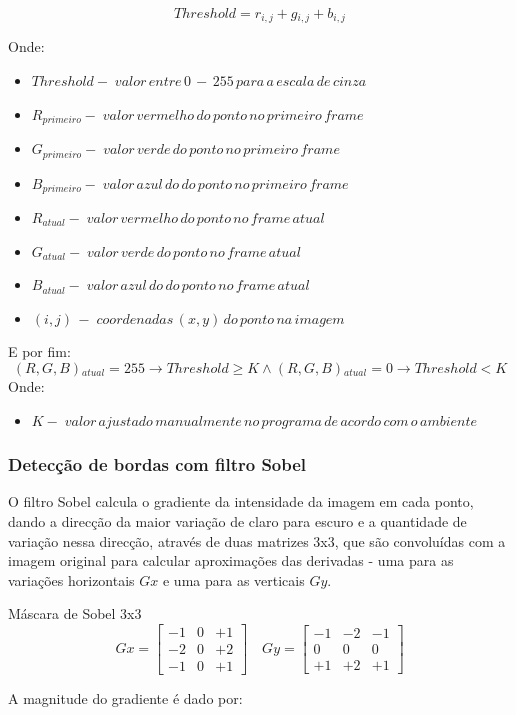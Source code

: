 \documentclass[12pt]{article}
\begin{document}
\begin{equation} \label{eq:threshold}
Threshold = r{_{i, j}} + g{_{i, j}} + b{_{i, j}}
\end{equation}

Onde:

\begin{itemize}  
  \item $Threshold -\; valor\,entre\,0\,-\,255\,para\,a\,escala\,de\,cinza $
  \item $R{_{primeiro}} -\; valor\,vermelho\,do\,ponto\,no\,primeiro\,frame\,$
  \item $G{_{primeiro}} -\; valor\,verde\,do\,ponto\,no\,primeiro\,frame \,$
  \item $B{_{primeiro}} -\; valor\,azul\,do\,do\,ponto\,no\,primeiro\,frame\,$
  \item $R{_{atual}}    -\; valor\,vermelho\,do\,ponto\,no\,frame\,atual$
  \item $G{_{atual}}    -\; valor\,verde\,do\,ponto\,no\,frame\,atual$
  \item $B{_{atual}}    -\; valor\,azul\,do\,do\,ponto\,no\,frame\,atual$
  \item $(i, j)       \,-\;coordenadas\, (x,y)\, do\, ponto\, na\, imagem$
\end{itemize}

E por fim:
\begin{equation}
(R, G, B){_{atual}} = 255 \rightarrow Threshold \geq K \wedge (R, G, B){_{atual}} = 0 \rightarrow Threshold < K
\end{equation}
Onde:

\begin{itemize}  
  \item $K -\; valor\,ajustado\,manualmente\,no\,programa\,de\,acordo\,com\,o\,ambiente$
\end{itemize}

\subsubsection{Detecção de bordas com filtro Sobel}

O filtro Sobel calcula o gradiente da intensidade da imagem em cada ponto, dando a direcção da maior variação de claro para escuro e a quantidade de variação nessa direcção, através de duas matrizes 3x3, que são convoluídas com a imagem original para calcular aproximações das derivadas - uma para as variações horizontais $Gx$ e uma para as verticais $Gy$.
\begin{center}{Máscara de Sobel 3x3}
$$
Gx=\left[\begin{array}{rrr}
-1&0&+1\\
-2&0&+2 \\
-1&0&+1
\end{array}\right]\quad
Gy=\left[\begin{array}{ccc}
-1&-2&-1\\
0& 0& 0 \\
+1&+2&+1
\end{array}\right]
$$
\end{center}
A magnitude do gradiente é dado por:
\end{document}
